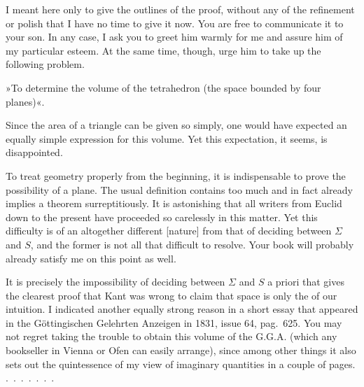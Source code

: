 %
I meant here only to give the outlines of the proof, without any of the refinement or polish that I have no time to give it now. You are free to communicate it to your son. In any case, I ask you to greet him warmly for me and assure him of my particular esteem. At the same time, though, urge him to take up the following problem.

»To determine the volume of the tetrahedron (the space bounded by four planes)«.

Since the area of a triangle can be given so simply, one would have expected an equally simple expression for this volume. Yet this expectation, it seems, is disappointed.

To treat geometry properly from the beginning, it is indispensable to prove the possibility of a plane. The usual definition contains too much and in fact already implies a theorem surreptitiously. It is astonishing that all writers from Euclid down to the present have proceeded so carelessly in this matter. Yet this difficulty is of an altogether different [nature] from that of deciding between $\Sigma$ and $S$, and the former is not all that difficult to resolve. Your book will probably already satisfy me on this point as well.

It is precisely the impossibility of deciding between $\Sigma$ and $S$ a priori that gives the clearest proof that Kant was wrong to claim that space is only the  of our intuition. I indicated another equally strong reason in a short essay that appeared in the Göttingischen Gelehrten Anzeigen in 1831, issue 64, pag.~625. You may not regret taking the trouble to obtain this volume of the G.G.A. (which any bookseller in Vienna or Ofen can easily arrange), since among other things it also sets out the quintessence of my view of imaginary quantities in a couple of pages. \mbox{.\ .\ .\ .\ .\ .\ .}

